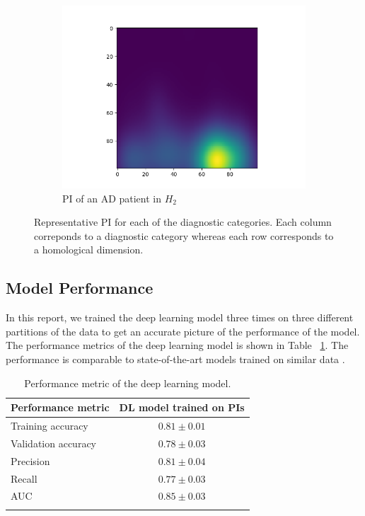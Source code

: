 \documentclass{article}
\begin{document}
\begin{figure}
\begin{subfigure}{0.3\textwidth}
    \includegraphics[width=\textwidth]{figures/PIs/Persistence_image_AD_h_2.png}
    \caption{PI of an AD patient in $H_2$}
  \end{subfigure}
  \caption{Representative PI for each of the diagnostic categories. Each column correponds to a diagnostic category whereas each row corresponds to a homological dimension.}
  \label{fig:sample_rep_pi}
\end{figure}

\subsection{Model Performance}

In this report, we trained the deep learning model three times on three different partitions of the data to get an accurate picture of the performance of the model. The performance metrics of the deep learning model is shown in Table ~\ref{tab:performance}. The performance is comparable to state-of-the-art models trained on similar data \citep{wen2020convolutional}.

\begin{table}
  \centering
  \begin{tabular}{lc}
    \toprule
    \textbf{Performance metric} & \textbf{DL model trained on PIs}\\
    \midrule
    Training accuracy & $0.81\pm 0.01$  \\
    Validation accuracy & $0.78\pm 0.03$  \\
    Precision & $0.81\pm 0.04$  \\
    Recall & $0.77\pm 0.03$  \\
    AUC & $0.85\pm 0.03$  \\
    \bottomrule
    \vspace{1pt}
  \end{tabular}
  \caption{Performance metric of the deep learning model.}
  \label{tab:performance}
\end{table}
\end{document}
